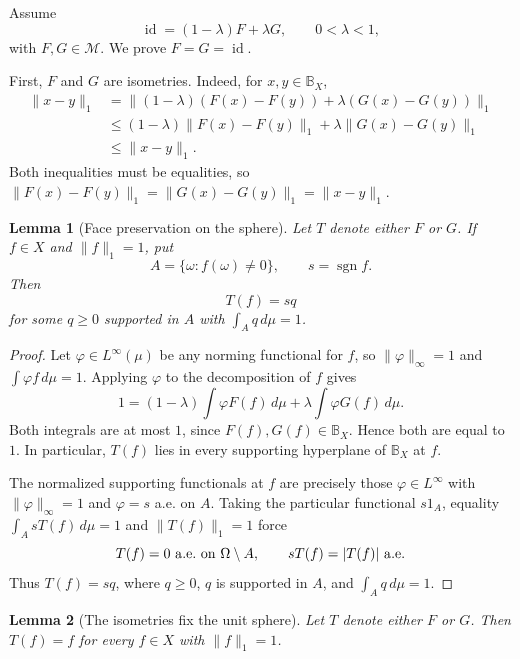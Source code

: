 \documentclass[11pt]{article}
\newtheorem{lemma}{Lemma}
\newcommand{\B}{\mathbb{B}}
\newcommand{\id}{\operatorname{id}}
\newcommand{\sgn}{\operatorname{sgn}}
\begin{document}
Assume
\[
   \id=(1-\lambda)F+\lambda G,\qquad 0<\lambda<1,
\]
with \(F,G\in\mathcal M\). We prove \(F=G=\id\).

First, \(F\) and \(G\) are isometries. Indeed, for \(x,y\in\B_X\),
\[
\begin{aligned}
\|x-y\|_1
&=\|(1-\lambda)(F(x)-F(y))+\lambda(G(x)-G(y))\|_1\\
&\le (1-\lambda)\|F(x)-F(y)\|_1+\lambda\|G(x)-G(y)\|_1\\
&\le \|x-y\|_1.
\end{aligned}
\]
Both inequalities must be equalities, so
\(\|F(x)-F(y)\|_1=\|G(x)-G(y)\|_1=\|x-y\|_1\).

\begin{lemma}[Face preservation on the sphere]
Let \(T\) denote either \(F\) or \(G\). If \(f\in X\) and \(\|f\|_1=1\), put
\[
   A=\{\omega:f(\omega)\ne0\},\qquad s=\sgn f .
\]
Then
\[
   T(f)=s q
\]
for some \(q\ge0\) supported in \(A\) with \(\int_A q\,d\mu=1\).
\end{lemma}

\begin{proof}
Let \(\varphi\in L^\infty(\mu)\) be any norming functional for \(f\), so
\(\|\varphi\|_\infty=1\) and \(\int\varphi f\,d\mu=1\). Applying \(\varphi\)
to the decomposition of \(f\) gives
\[
   1=(1-\lambda)\int\varphi F(f)\,d\mu
      +\lambda\int\varphi G(f)\,d\mu .
\]
Both integrals are at most \(1\), since \(F(f),G(f)\in\B_X\). Hence both are
equal to \(1\). In particular, \(T(f)\) lies in every supporting hyperplane of
\(\B_X\) at \(f\).

The normalized supporting functionals at \(f\) are precisely those
\(\varphi\in L^\infty\) with \(\|\varphi\|_\infty=1\) and \(\varphi=s\) a.e.
on \(A\). Taking the particular functional \(s1_A\), equality
\(\int_A sT(f)\,d\mu=1\) and \(\|T(f)\|_1=1\) force
\[
   T(f)=0\ {\rm a.e.\ on}\ \Omega\setminus A,\qquad sT(f)=|T(f)|\ {\rm a.e.}
\]
Thus \(T(f)=sq\), where \(q\ge0\), \(q\) is supported in \(A\), and
\(\int_A q\,d\mu=1\).
\end{proof}

\begin{lemma}[The isometries fix the unit sphere]
Let \(T\) denote either \(F\) or \(G\). Then \(T(f)=f\) for every
\(f\in X\) with \(\|f\|_1=1\).
\end{lemma}
\end{document}
